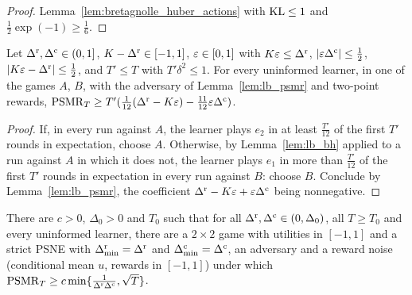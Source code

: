 \begin{proof}
  \leanok
  Lemma~\ref{lem:bretagnolle_huber_actions} with $\mathrm{KL} \le 1$ and $\frac12 \exp(-1) \ge \frac16$.
\end{proof}

\begin{lemma}
  \label{lem:lb_params}
  \leanok
  Let $\Delta^{\mathrm{r}}, \Delta^{\mathrm{c}} \in (0, 1]$, $K - \Delta^{\mathrm{r}} \in [-1, 1]$, $\varepsilon \in [0, 1]$ with $K \varepsilon \le \Delta^{\mathrm{r}}$,
  $\lvert \varepsilon \Delta^{\mathrm{c}} \rvert \le \frac12$, $\lvert K \varepsilon - \Delta^{\mathrm{r}} \rvert \le \frac12$, and $T' \le T$ with
  $T' \delta^2 \le 1$. For every uninformed learner, in one of the games $A$, $B$, with the
  adversary of Lemma~\ref{lem:lb_psmr} and two-point rewards,
  $\mathrm{PSMR}_T \ge T'(\frac1{12}(\Delta^{\mathrm{r}} - K\varepsilon) - \frac{11}{12} \varepsilon \Delta^{\mathrm{c}})$.
\end{lemma}

\begin{proof}
  \leanok
  If, in every run against $A$, the learner plays $e_2$ in at least $\frac{T'}{12}$ of the first
  $T'$ rounds in expectation, choose $A$. Otherwise, by Lemma~\ref{lem:lb_bh} applied to a run
  against $A$ in which it does not, the learner plays $e_1$ in more than $\frac{T'}{12}$ of the
  first $T'$ rounds in expectation in every run against $B$: choose $B$. Conclude by
  Lemma~\ref{lem:lb_psmr}, the coefficient $\Delta^{\mathrm{r}} - K\varepsilon + \varepsilon\Delta^{\mathrm{c}}$ being nonnegative.
\end{proof}

\begin{theorem}[Theorem 2]
  \label{thm:uninformed_lb}
  \leanok
  There are $c > 0$, $\Delta_0 > 0$ and $T_0$ such that for all $\Delta^{\mathrm{r}}, \Delta^{\mathrm{c}} \in (0, \Delta_0)$, all
  $T \ge T_0$ and every uninformed learner, there are a $2 \times 2$ game with utilities in
  $[-1, 1]$ and a strict PSNE with $\Delta^{\mathrm{r}}_{\min} = \Delta^{\mathrm{r}}$ and $\Delta^{\mathrm{c}}_{\min} = \Delta^{\mathrm{c}}$, an adversary and a reward
  noise (conditional mean $u$, rewards in $[-1, 1]$) under which
  $\mathrm{PSMR}_T \ge c \min\{\frac{1}{\Delta^{\mathrm{r}} \Delta^{\mathrm{c}}}, \sqrt T\}$.
\end{theorem}

